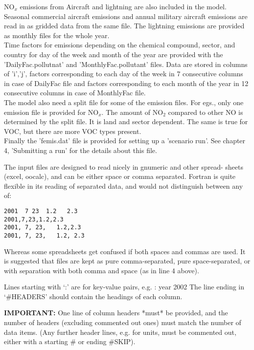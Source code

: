 NO$_{x}$ emissions from Aircraft and lightning are also included in the
model. Seasonal commercial aircraft emissions and annual military
aircraft emissions are read in as gridded data from the same file.
The lightning emissions are provided as monthly files for the whole
year.      \\

Time factors for emissions depending on the chemical compound, sector,
and country for day of the week and month of the year are provided with
the 'DailyFac.pollutnat' and 'MonthlyFac.pollutant' files.  Data are
stored in columns of 'i','j', factors corresponding to each day of the
week in 7 consecutive columns in case of DailyFac file and factors
corresponding to each month of the year in 12 consecutive columns in
case of MonthlyFac file.\\  

The model also need a split file for some of the emission files.  For
egs., only one emission file is provided for NO$_{x}$.  The amount of
NO$_{2}$ compared to other NO is determined by the split file.  It is
land and sector dependent.  The same is true for VOC, but
there are more VOC types present. \\ 

Finally the 'femis.dat' file is provided for setting up a 'scenario run'.  See
chapter 4, 'Submitting a run' for the details about this file.  

 
\bigskip

 The input files are designed to read nicely in gnumeric and other spread-
 sheets (excel, oocalc), and can be either space or comma separated.
 Fortran is quite flexible in its reading of separated data, and
would not distinguish between any of:
\begin{verbatim}
2001  7 23  1.2   2.3
2001,7,23,1.2,2.3
2001, 7, 23,   1.2,2.3
2001, 7, 23,   1.2, 2.3
\end{verbatim}

Whereas some spreadsheets get confused if both spaces and commas
are used. It is suggested that files are kept as 
pure comma-separated,
pure space-separated,
or with separation with both comma and space (as in line 4 above).
\bigskip

Lines starting with `:' are for key-value pairs, e.g. : year 2002
The line ending in `\#HEADERS' should contain the headings of each column.
\bigskip

{\bf IMPORTANT:} One line of column headers *must* be provided, and the
 number of headers (excluding commented out ones)  must match the number of data items.
(Any further header lines, e.g. for units, must be commented out, either with
a starting \# or ending \#SKIP).

